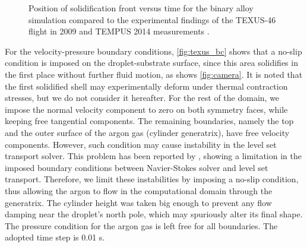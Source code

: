 \begin{figure}[htbp]
\centering
{}
\caption{Position of solidification front versus time for the binary alloy 
simulation compared to the experimental findings of the TEXUS-46 flight 
in 2009 and TEMPUS 2014 measurements \citep{gandin_project_2014}.}
\label{fig:position_vs_time_binary}
\end{figure}


For the velocity-pressure boundary conditions, \cref{fig:texus_bc} shows that a no-slip condition is imposed
on the droplet-substrate surface, 
since this area solidifies in the first place without further fluid motion, as shows \cref{fig:camera}.
It is noted that the first solidified shell may experimentally deform under thermal contraction stresses, but we do not consider it 
hereafter. For the rest of the domain, we impose the normal velocity component to zero on both symmetry faces, 
while keeping free tangential components. The remaining boundaries, namely the top and the outer surface of the argon gas (cylinder generatrix),
have free velocity components. However, such condition may cause instability in the level set transport solver. 
This problem has been reported by \citep{basset_simulation_2006}, showing a limitation in the imposed boundary conditions between Navier-Stokes solver and level set transport. 
Therefore, we limit these instabilities by imposing a no-slip condition, thus allowing the argon to flow in the computational
domain through the generatrix. The cylinder height was taken big enough to prevent any flow damping near the droplet's north pole,
which may spuriously alter its final shape. The pressure condition for the argon gas is left free for all boundaries.
The adopted time step is 0.01 s.

